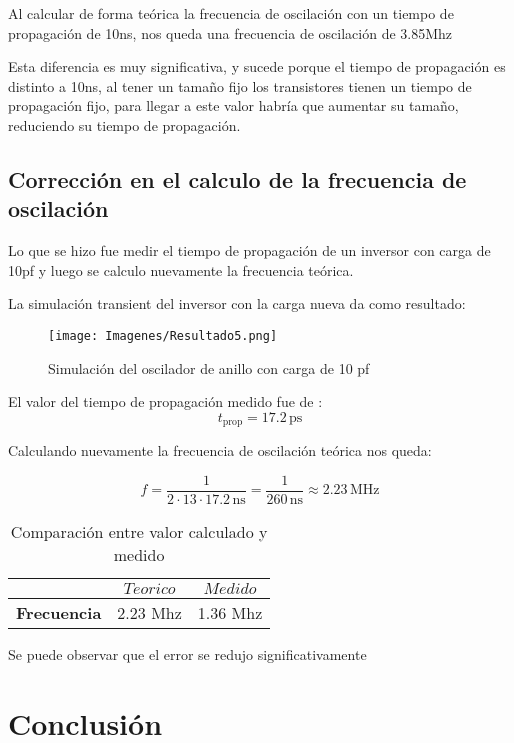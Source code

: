 \documentclass[11pt, a4paper]{article}
\begin{document}
Al calcular de forma teórica la frecuencia de oscilación con un tiempo de propagación de 10ns, nos queda una frecuencia de oscilación de 3.85Mhz

Esta diferencia es muy significativa, y sucede porque el tiempo de propagación es distinto a 10ns, al tener un tamaño fijo los transistores tienen un tiempo de propagación fijo, para llegar a este valor habría que aumentar su tamaño, reduciendo su tiempo de propagación.

\subsection{Corrección en el calculo de la frecuencia de oscilación}


Lo que se hizo fue medir el tiempo de propagación de un inversor con carga de 10pf y luego se calculo nuevamente la frecuencia teórica.

La simulación transient del inversor con la carga nueva da como resultado:

\begin{figure}[H]
    \centering
    \texttt{[image: Imagenes/Resultado5.png]}
    \caption{Simulación del oscilador de anillo con carga de 10 pf}
    \label{fig:resultado5}
    \end{figure}

El valor del tiempo de propagación medido fue de :
    \begin{equation}
t_{\text{prop}} = 17.2 \, \mathrm{ps}
\end{equation}

Calculando nuevamente la frecuencia de oscilación teórica nos queda:

\[
f = \frac{1}{2 \cdot 13 \cdot 17.2 \, \mathrm{ns}} = \frac{1}{260 \, \mathrm{ns}} \approx 2.23 \, \mathrm{MHz}
\]

\begin{table}[H]
\centering
\begin{tabular}{|c|c|c|}
\hline
 & $Teorico$ & $Medido$\\ \hline
\textbf{Frecuencia} & 2.23 Mhz & 1.36 Mhz \\ \hline
\end{tabular}
\caption{Comparación entre valor calculado y medido}
\label{tab:two_by_two2}
\end{table}

Se puede observar que el error se redujo significativamente

\section{Conclusión}
\end{document}
